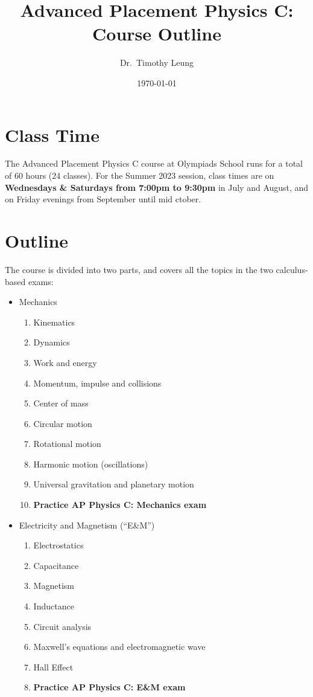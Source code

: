 \documentclass{../../oss-handout}
\title{Advanced Placement Physics C: Course Outline}
\author{Dr.\ Timothy Leung}%
\date{\today}
\begin{document}
\thispagestyle{title}
\gentitle

\section*{Class Time}
The Advanced Placement Physics C course at Olympiads School runs for a total of
60 hours (24 classes). For the Summer 2023 session, class times are on
\textbf{Wednesdays \& Saturdays from 7:00pm to 9:30pm} in July and August, and
on Friday evenings from September until mid ctober.

\section*{Outline}
The course is divided into two parts, and covers all the topics in the two
calculus-based exams:
\begin{itemize}[nosep,leftmargin=15pt]
\item Mechanics
  \begin{enumerate}[nosep]
  \item Kinematics
  \item Dynamics
  \item Work and energy
  \item Momentum, impulse and collisions
  \item Center of mass
  \item Circular motion
  \item Rotational motion
  \item Harmonic motion (oscillations)
  \item Universal gravitation and planetary motion
  \item\textbf{Practice AP Physics C: Mechanics exam}
  \end{enumerate}
\item Electricity and Magnetism (``E\&M'')
  \begin{enumerate}
  \item Electrostatics
  \item Capacitance
  \item Magnetism
  \item Inductance
  \item Circuit analysis %
  \item Maxwell's equations and electromagnetic wave
  \item Hall Effect
  \item\textbf{Practice AP Physics C: E\&M exam}
  \end{enumerate}
\end{itemize}
\end{document}
